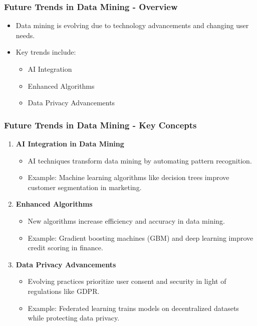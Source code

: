 \documentclass[aspectratio=169]{beamer}
\begin{document}
\begin{frame}[fragile]
    \frametitle{Future Trends in Data Mining - Overview}
    \begin{itemize}
        \item Data mining is evolving due to technology advancements and changing user needs.
        \item Key trends include:
        \begin{itemize}
            \item AI Integration
            \item Enhanced Algorithms
            \item Data Privacy Advancements
        \end{itemize}
    \end{itemize}
\end{frame}

\begin{frame}[fragile]
    \frametitle{Future Trends in Data Mining - Key Concepts}
    \begin{enumerate}
        \item \textbf{AI Integration in Data Mining}
        \begin{itemize}
            \item AI techniques transform data mining by automating pattern recognition.
            \item Example: Machine learning algorithms like decision trees improve customer segmentation in marketing.
        \end{itemize}

        \item \textbf{Enhanced Algorithms}
        \begin{itemize}
            \item New algorithms increase efficiency and accuracy in data mining.
            \item Example: Gradient boosting machines (GBM) and deep learning improve credit scoring in finance.
        \end{itemize}
        
        \item \textbf{Data Privacy Advancements}
        \begin{itemize}
            \item Evolving practices prioritize user consent and security in light of regulations like GDPR.
            \item Example: Federated learning trains models on decentralized datasets while protecting data privacy.
        \end{itemize}
    \end{enumerate}
\end{frame}
\end{document}
